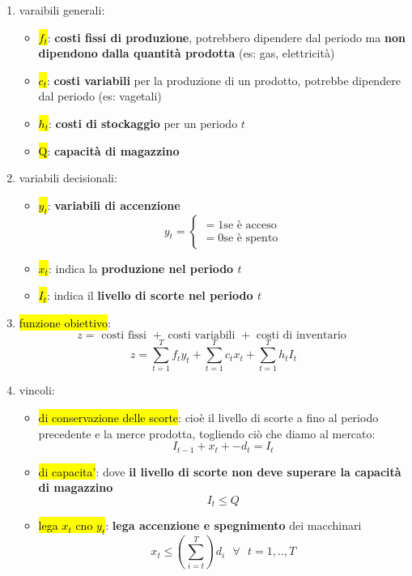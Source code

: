 \begin{enumerate}
    \item varaibili generali:
    \begin{itemize}
        \item \hl{$f_t$}: \textbf{costi fissi di produzione}, potrebbero dipendere dal periodo ma \textbf{non dipendono dalla quantità prodotta} (es: gas, elettricità)
        \item \hl{$c_t$}: \textbf{costi variabili} per la produzione di un prodotto, potrebbe dipendere dal periodo (es: vagetali)
        \item \hl{$h_t$}: \textbf{costi di stockaggio} per un periodo $t$
        \item \hl{Q}: \textbf{capacità di magazzino}
    \end{itemize}

    \item variabili decisionali:
    \begin{itemize}
        \item \hl{$y_t$}: \textbf{variabili di accenzione}
            $$y_t =
            \begin{cases} 
                = 1 \text{se è acceso} \\ 
                = 0 \text{se è spento}
            \end{cases}
            $$

        \item \hl{$x_t$}: indica la \textbf{produzione nel periodo $t$}
        \item \hl{$I_t$}: indica il \textbf{livello di scorte nel periodo $t$}
    \end{itemize}

    \item \hl{funzione obiettivo}:
        $$z = \text{ costi fissi } + \text{ costi variabili } + \text{ costi di inventario }$$
        $$z = \sum_{t=1}^T f_t y_t + \sum_{t=1}^T c_t x_t + \sum_{t=1}^T h_tI_t$$

    \item vincoli:
    \begin{itemize}
        \item \hl{di conservazione delle scorte}: cioè il livello di scorte a fino al periodo precedente e la merce prodotta, togliendo ciò che diamo al mercato:
            $$I_{t-1} + x_t + -d_t = I_t$$
        \item \hl{di capacita'}: dove \textbf{il livello di scorte non deve superare la capacità di magazzino}
            $$I_t \leq Q$$
        \item \hl{lega $x_t$ cno $y_t$}: \textbf{lega accenzione e spegnimento} dei macchinari
            $$x_t \leq (\sum_{i=t}^T) d_i\ \ \ \forall\ \ \ t=1,..,T$$


\end{itemize}
\end{enumerate}
